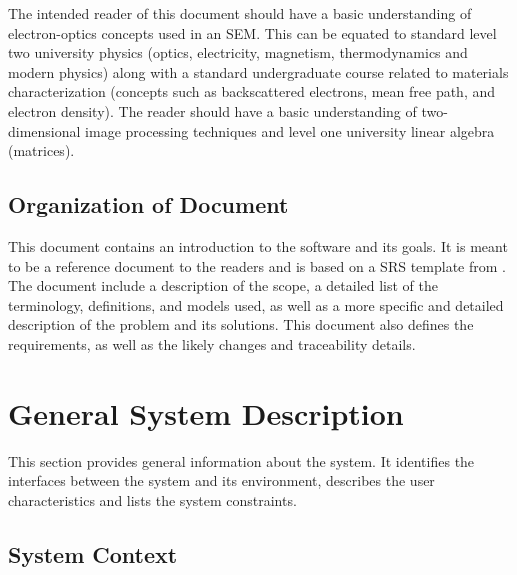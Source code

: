 \documentclass[12pt]{article}
\begin{document}
The intended reader of this document should have a basic understanding of 
electron-optics concepts used in an SEM. This can be equated to standard level 
two university physics (optics, electricity, magnetism, thermodynamics and 
modern physics) along with a standard undergraduate course related to materials 
characterization (concepts such as backscattered electrons, mean free path, and 
electron density). The reader should have a basic understanding of two-dimensional 
image processing techniques and level one university linear algebra (matrices).

\subsection{Organization of Document}

This document contains an introduction to the software and its goals. It is 
meant to be a reference document to the readers and is based on a SRS template from \citet{SmithAndLai2005, SmithEtAl2007}. The document include a 
description of the scope, a detailed list of the terminology, definitions, and 
models used, as well as a more specific and detailed description of the problem 
and its solutions. This document also defines the requirements, as well as the  
likely changes and traceability details.

\section{General System Description}

This section provides general information about the system.  It identifies the
interfaces between the system and its environment, describes the user
characteristics and lists the system constraints.


\subsection{System Context}
\end{document}
